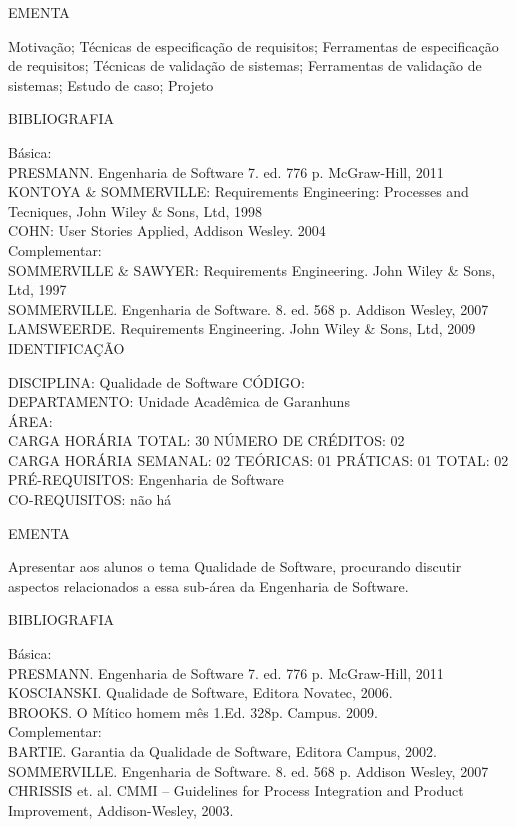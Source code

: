 \documentclass[
	12pt,				%
	openright,			%
  oneside,     %
	a4paper,			%
	english,			%
	french,				%
	spanish,			%
	brazil				%
	]{abntex2}
\begin{document}
\begin{apendicesenv}
EMENTA 

Motivação; Técnicas de especificação de requisitos; Ferramentas de especificação de requisitos; Técnicas de validação de sistemas; Ferramentas de validação de sistemas; Estudo de caso; Projeto

BIBLIOGRAFIA 

Básica:\\
PRESMANN. Engenharia de Software 7. ed. 776 p. McGraw-Hill, 2011\\
KONTOYA \& SOMMERVILLE: Requirements Engineering: Processes and
Tecniques, John Wiley \& Sons, Ltd, 1998\\
COHN: User Stories Applied, Addison Wesley. 2004\\
Complementar:\\
SOMMERVILLE \& SAWYER: Requirements Engineering. John Wiley \& Sons,
Ltd, 1997 \\
SOMMERVILLE. Engenharia de Software. 8. ed. 568 p. Addison Wesley, 2007\\
LAMSWEERDE. Requirements Engineering. John Wiley \& Sons, Ltd, 2009\\

\newpage IDENTIFICAÇÃO

DISCIPLINA: Qualidade de Software CÓDIGO:\\ 
DEPARTAMENTO: Unidade Acadêmica de Garanhuns\\
ÁREA: \\
CARGA HORÁRIA TOTAL: 30 NÚMERO DE CRÉDITOS: 02\\
CARGA HORÁRIA SEMANAL: 02 TEÓRICAS: 01 PRÁTICAS: 01 TOTAL: 02\\
PRÉ-REQUISITOS: Engenharia de Software\\
CO-REQUISITOS: não há

EMENTA 

Apresentar aos alunos o tema Qualidade de Software, procurando discutir
aspectos relacionados a essa sub-área da Engenharia de Software.

BIBLIOGRAFIA 

Básica:\\
PRESMANN. Engenharia de Software 7. ed. 776 p. McGraw-Hill, 2011\\
KOSCIANSKI. Qualidade de Software, Editora Novatec, 2006.\\
BROOKS. O Mítico homem mês 1.Ed. 328p. Campus. 2009.\\
Complementar:\\
BARTIE. Garantia da Qualidade de Software, Editora Campus, 2002.\\
SOMMERVILLE. Engenharia de Software. 8. ed. 568 p. Addison Wesley, 2007\\
CHRISSIS et. al. CMMI -- Guidelines for Process Integration and Product
Improvement, Addison-Wesley, 2003.


\end{apendicesenv}
\end{document}
